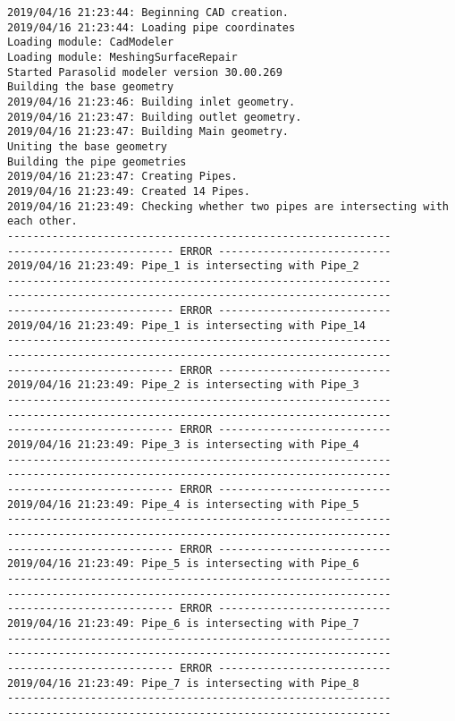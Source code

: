 \documentclass{article}
\begin{document}
{\tiny 
\begin{verbatim}
2019/04/16 21:23:44: Beginning CAD creation.
2019/04/16 21:23:44: Loading pipe coordinates
Loading module: CadModeler
Loading module: MeshingSurfaceRepair
Started Parasolid modeler version 30.00.269
Building the base geometry
2019/04/16 21:23:46: Building inlet geometry.
2019/04/16 21:23:47: Building outlet geometry.
2019/04/16 21:23:47: Building Main geometry.
Uniting the base geometry
Building the pipe geometries
2019/04/16 21:23:47: Creating Pipes.
2019/04/16 21:23:49: Created 14 Pipes.
2019/04/16 21:23:49: Checking whether two pipes are intersecting with each other.
------------------------------------------------------------
-------------------------- ERROR ---------------------------
2019/04/16 21:23:49: Pipe_1 is intersecting with Pipe_2
------------------------------------------------------------
------------------------------------------------------------
-------------------------- ERROR ---------------------------
2019/04/16 21:23:49: Pipe_1 is intersecting with Pipe_14
------------------------------------------------------------
------------------------------------------------------------
-------------------------- ERROR ---------------------------
2019/04/16 21:23:49: Pipe_2 is intersecting with Pipe_3
------------------------------------------------------------
------------------------------------------------------------
-------------------------- ERROR ---------------------------
2019/04/16 21:23:49: Pipe_3 is intersecting with Pipe_4
------------------------------------------------------------
------------------------------------------------------------
-------------------------- ERROR ---------------------------
2019/04/16 21:23:49: Pipe_4 is intersecting with Pipe_5
------------------------------------------------------------
------------------------------------------------------------
-------------------------- ERROR ---------------------------
2019/04/16 21:23:49: Pipe_5 is intersecting with Pipe_6
------------------------------------------------------------
------------------------------------------------------------
-------------------------- ERROR ---------------------------
2019/04/16 21:23:49: Pipe_6 is intersecting with Pipe_7
------------------------------------------------------------
------------------------------------------------------------
-------------------------- ERROR ---------------------------
2019/04/16 21:23:49: Pipe_7 is intersecting with Pipe_8
------------------------------------------------------------
------------------------------------------------------------

\end{verbatim}}
\end{document}
